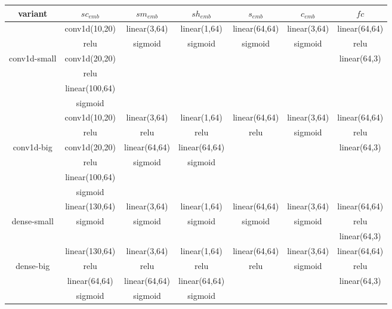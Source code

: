 \begin{tabular}{|c|c|c|c|c|c|c|}
    \hline
        variant & $sc_{emb}$      & $sm_{emb}$   & $sh_{emb}$   & $s_{emb}$    & $c_{emb}$    & $fc$ \\
    \hline
                & conv1d(10,20)   & linear(3,64) & linear(1,64) & linear(64,64)& linear(3,64) & linear(64,64)\\
                & relu            & sigmoid      & sigmoid      & sigmoid      & sigmoid      & relu\\
    conv1d-small  & conv1d(20,20)   &              &              &              &              & linear(64,3)\\
                & relu            &              &              &         &         &      \\
                & linear(100,64)  &              &              &         &         &      \\
                & sigmoid         &              &              &         &         &      \\
    \hline
                & conv1d(10,20)   & linear(3,64) & linear(1,64) & linear(64,64)& linear(3,64) & linear(64,64)\\
                & relu            & relu         & relu         & relu         & sigmoid      & relu\\
    conv1d-big & conv1d(20,20)   & linear(64,64)& linear(64,64)&              &              & linear(64,3)\\
                & relu            & sigmoid      & sigmoid      &              &              &      \\
                & linear(100,64)  &          &          &         &         &      \\
                & sigmoid         &          &          &         &         &      \\
    \hline
                & linear(130,64)  & linear(3,64) & linear(1,64) & linear(64,64)& linear(3,64) & linear(64,64)\\
    dense-small & sigmoid         & sigmoid      & sigmoid      & sigmoid      & sigmoid      & relu\\
                &                 &              &              &              &              & linear(64,3)\\
    \hline
                & linear(130,64)  & linear(3,64) & linear(1,64) & linear(64,64)& linear(3,64) & linear(64,64)\\
    dense-big & relu            & relu         & relu         & relu         & sigmoid      & relu\\
                & linear(64,64)   & linear(64,64)& linear(64,64)&              &              & linear(64,3)\\
                & sigmoid         & sigmoid      & sigmoid      &              &              &      \\
    \hline
\end{tabular}
